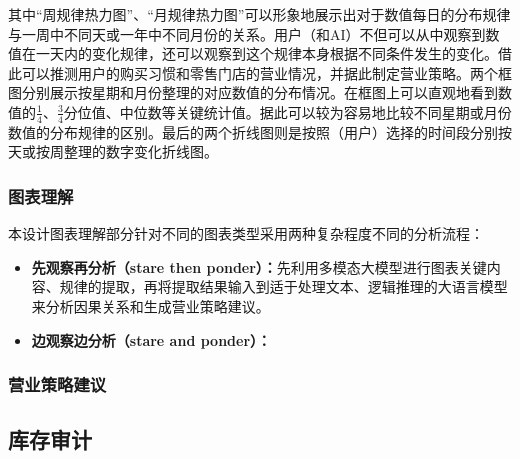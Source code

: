 其中“周规律热力图”、“月规律热力图”可以形象地展示出对于数值每日的分布规律与一周中不同天或一年中不同月份的关系。用户（和AI）不但可以从中观察到数值在一天内的变化规律，还可以观察到这个规律本身根据不同条件发生的变化。借此可以推测用户的购买习惯和零售门店的营业情况，并据此制定营业策略。两个框图分别展示按星期和月份整理的对应数值的分布情况。在框图上可以直观地看到数值的$\frac{1}{4}$、$\frac{3}{4}$分位值、中位数等关键统计值。据此可以较为容易地比较不同星期或月份数值的分布规律的区别。最后的两个折线图则是按照（用户）选择的时间段分别按天或按周整理的数字变化折线图。

\subsubsection{图表理解}

本设计图表理解部分针对不同的图表类型采用两种复杂程度不同的分析流程：

\begin{itemize}
    \item \textbf{先观察再分析（stare then ponder）：}先利用多模态大模型进行图表关键内容、规律的提取，再将提取结果输入到适于处理文本、逻辑推理的大语言模型来分析因果关系和生成营业策略建议。
    \item \textbf{边观察边分析（stare and ponder）：}
\end{itemize}

\subsubsection{营业策略建议}

\subsection{库存审计}